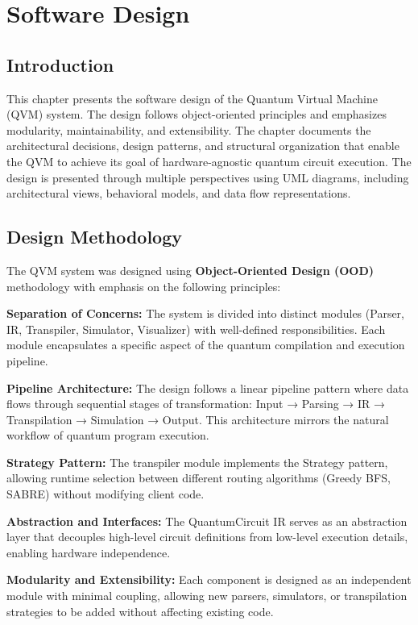 \chapter{Software Design}

\section{Introduction}
This chapter presents the software design of the Quantum Virtual Machine (QVM) system. The design follows object-oriented principles and emphasizes modularity, maintainability, and extensibility. The chapter documents the architectural decisions, design patterns, and structural organization that enable the QVM to achieve its goal of hardware-agnostic quantum circuit execution. The design is presented through multiple perspectives using UML diagrams, including architectural views, behavioral models, and data flow representations.

\section{Design Methodology}
The QVM system was designed using \textbf{Object-Oriented Design (OOD)} methodology with emphasis on the following principles:

\textbf{Separation of Concerns:} The system is divided into distinct modules (Parser, IR, Transpiler, Simulator, Visualizer) with well-defined responsibilities. Each module encapsulates a specific aspect of the quantum compilation and execution pipeline.

\textbf{Pipeline Architecture:} The design follows a linear pipeline pattern where data flows through sequential stages of transformation: Input → Parsing → IR → Transpilation → Simulation → Output. This architecture mirrors the natural workflow of quantum program execution.

\textbf{Strategy Pattern:} The transpiler module implements the Strategy pattern, allowing runtime selection between different routing algorithms (Greedy BFS, SABRE) without modifying client code.

\textbf{Abstraction and Interfaces:} The QuantumCircuit IR serves as an abstraction layer that decouples high-level circuit definitions from low-level execution details, enabling hardware independence.

\textbf{Modularity and Extensibility:} Each component is designed as an independent module with minimal coupling, allowing new parsers, simulators, or transpilation strategies to be added without affecting existing code.

